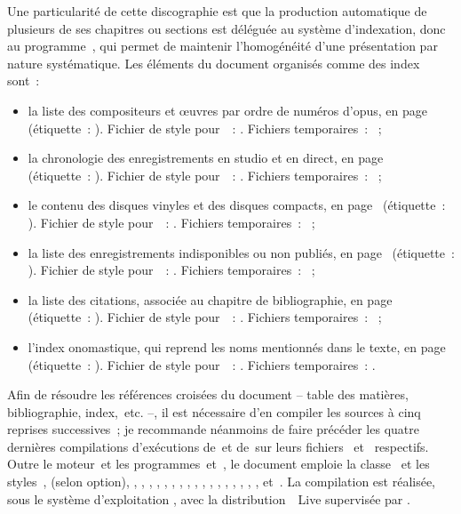 Une particularité de cette discographie est que la production automatique de
plusieurs de ses chapitres ou sections est déléguée au système d'indexation,
donc au programme~\Xindy, qui permet de maintenir l'homogénéité d'une
présentation par nature systématique.
Les éléments du document organisés comme des index sont~:
\begin{itemize}
 \item
 la liste des compositeurs et œuvres par ordre de numéros d'opus, en
 page~\pageref{chap:Oeuvres} (étiquette~: ).
 Fichier de style pour~\Xindy~: .
 Fichiers temporaires~: ~;
 \item
 la chronologie des enregistrements en studio et en direct, en
 page~\pageref{chap:Chronologie} (étiquette~: ).
 Fichier de style pour~\Xindy~: .
 Fichiers temporaires~: ~;
 \item
 le contenu des disques vinyles et des disques compacts, en
 page~\pageref{chap:Contenu} (étiquette~: ).
 Fichier de style pour~\Xindy~: .
 Fichiers temporaires~: ~;
 \item
 la liste des enregistrements indisponibles ou non publiés, en
 page~\pageref{sec:IndisponibleNonpublie} (étiquette~: ).
 Fichier de style pour~\Xindy~: .
 Fichiers temporaires~: ~;
 \item
 la liste des citations, associée au chapitre de bibliographie, en
 page~\pageref{chap:Listedescitations} (étiquette~: ).
 Fichier de style pour~\Xindy~: .
 Fichiers temporaires~: ~;
 \item
 l'index onomastique, qui reprend les noms mentionnés dans le texte, en
 page~\pageref{chap:Indexonomastique} (étiquette~: ).
 Fichier de style pour~\Xindy~: .
 Fichiers temporaires~: .
\end{itemize}

Afin de résoudre les références croisées du document -- table des matières,
bibliographie, index,~etc. --, il est nécessaire d'en compiler les sources à
cinq reprises successives~; je recommande néanmoins de faire précéder les
quatre dernières compilations d'exécutions de~\Biber et de~\Xindy sur leurs
fichiers~ et~ respectifs.
Outre le moteur~\Luatex et les programmes~\Biber et~\Xindy, le document
emploie la classe~ et les styles~,
 (selon option), , ,
, , , ,
, , , ,
, , , ,
, , ,
 et~.
La compilation est réalisée, sous le système d'exploitation \citet{Debian},
avec la distribution~\Tex{}~Live supervisée par \citet{TeXLive}.


